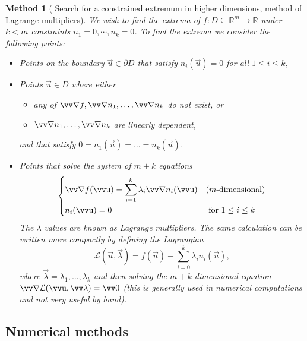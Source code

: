 \documentclass[twocolumn, margin=small]{tex/hsrzf}
\theoremstyle{fuvarzf}
\newtheorem{method}{Method}
\begin{document}
\begin{method}[%
    Search for a constrained extremum in higher dimensions,
    method of Lagrange multipliers]
  We wish to find the extrema of \(f: D \subseteq \mathbb{R}^m \to \mathbb{R}\)
  under \(k < m\) constraints \(n_1 = 0, \cdots, n_k = 0\). To find the extrema 
  we consider the following points:
  \begin{itemize}
    \item Points on the boundary \(\vec{u} \in \partial D\) that satisfy
      \(n_i(\vec{u}) = 0\) for all \(1 \leq i \leq k\), 

    \item Points \(\vec{u} \in D\) where either
      \begin{itemize}
        \item any of \(\grad f, \grad n_1, \ldots, \grad n_k\) do not exist, or
        \item \(\grad n_1, \ldots, \grad n_k\) are linearly \emph{dependent},
      \end{itemize}
      and that satisfy \(0 = n_1(\vec{u}) = \ldots = n_k(\vec{u})\).

    \item Points that solve the system of \(m+k\) equations
      \[
        \begin{dcases}
          \grad f(\vec{u}) = \sum_{i = 1}^k \lambda_i \grad n_i(\vec{u})
            & (m\text{-dimensional}) \\
          n_i(\vec{u}) = 0  & \text{ for } 1 \leq i \leq k
        \end{dcases}
      \]
      The \(\lambda\) values are known as \emph{Lagrange multipliers}. The same
      calculation can be written more compactly by defining the
      \emph{Lagrangian}
      \[
        \mathcal{L}(\vec{u}, \vec{\lambda}) 
          = f(\vec{u}) - \sum_{i = 0}^k \lambda_i n_i(\vec{u}),
      \]
      where \(\vec{\lambda} = \lambda_1, \ldots, \lambda_k\) and then solving
      the \(m+k\) dimensional equation \(\grad \mathcal{L}(\vec{u},
      \vec{\lambda}) = \vec{0}\) (this is generally used in numerical
      computations and not very useful by hand).
  \end{itemize}
\end{method}

\subsection{Numerical methods}
\end{document}

